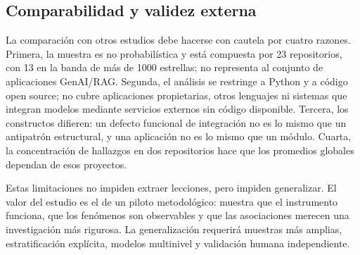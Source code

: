 \subsection{Comparabilidad y validez externa}

La comparación con otros estudios debe hacerse con cautela por cuatro razones. Primera, la muestra es no probabilística y está compuesta por 23 repositorios, con 13 en la banda de más de 1000 estrellas; no representa al conjunto de aplicaciones GenAI/RAG. Segunda, el análisis se restringe a Python y a código open source; no cubre aplicaciones propietarias, otros lenguajes ni sistemas que integran modelos mediante servicios externos sin código disponible. Tercera, los constructos difieren: un defecto funcional de integración no es lo mismo que un antipatrón estructural, y una aplicación no es lo mismo que un módulo. Cuarta, la concentración de hallazgos en dos repositorios hace que los promedios globales dependan de esos proyectos.

Estas limitaciones no impiden extraer lecciones, pero impiden generalizar. El valor del estudio es el de un piloto metodológico: muestra que el instrumento funciona, que los fenómenos son observables y que las asociaciones merecen una investigación más rigurosa. La generalización requerirá muestras más amplias, estratificación explícita, modelos multinivel y validación humana independiente.
